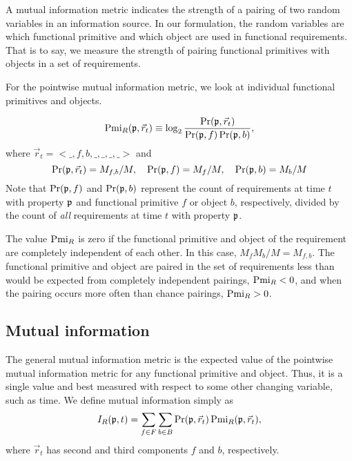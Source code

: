 \documentclass{article}
\begin{document}
A mutual information metric indicates the strength of a pairing of two
random variables in an information source. In our formulation, the
random variables are which functional primitive and which object are
used in functional requirements. That is to say, we measure the
strength of pairing functional primitives with objects in a set of
requirements.

For the pointwise mutual information metric, we look at individual
functional primitives and objects.

\begin{equation}
\operatorname{Pmi}_R(\mathfrak{p}, \vec{r}_t) \equiv \log_2 \frac{\operatorname{Pr}(\mathfrak{p}, \vec{r}_t)}{\operatorname{Pr}(\mathfrak{p}, f)\operatorname{Pr}(\mathfrak{p}, b)},
\end{equation}
where $\vec{r}_t = <\_,f,b,\_,\_,\_,\_>$ and
\begin{equation*}
\operatorname{Pr}(\mathfrak{p}, \vec{r}_t) = M_{f,b} / M, \quad \operatorname{Pr}(\mathfrak{p}, f) = M_f / M, \quad \operatorname{Pr}(\mathfrak{p}, b) = M_b / M
\end{equation*}
Note that $\operatorname{Pr}(\mathfrak{p}, f)$ and $\operatorname{Pr}(\mathfrak{p}, b)$ represent the
count of requirements at time $t$ with property $\mathfrak{p}$ and
functional primitive $f$ or object $b$, respectively, divided by the
count of \textit{all} requirements at time $t$ with property
$\mathfrak{p}$.

The value $\operatorname{Pmi}_R$ is zero if the functional primitive and object of
the requirement are completely independent of each other. In this
case, $M_f M_b / M = M_{f,b}$.  The functional primitive and object
are paired in the set of requirements less than would be expected from
completely independent pairings, $\operatorname{Pmi}_R < 0$, and when the pairing
occurs more often than chance pairings, $\operatorname{Pmi}_R > 0$. 

\subsection{Mutual information}

The general mutual information metric is the expected value of the
pointwise mutual information metric for any functional primitive and
object. Thus, it is a single value and best measured with respect to
some other changing variable, such as time. We define mutual
information simply as
\begin{equation}
\label{eq:mutual_info}
I_R(\mathfrak{p}, t) = \sum_{f \in F} \sum_{b \in B} \operatorname{Pr}(\mathfrak{p}, \vec{r}_t) \operatorname{Pmi}_R(\mathfrak{p}, \vec{r}_t),
\end{equation}
where $\vec{r}_t$ has second and third components $f$ and $b$,
respectively.




\end{document}
